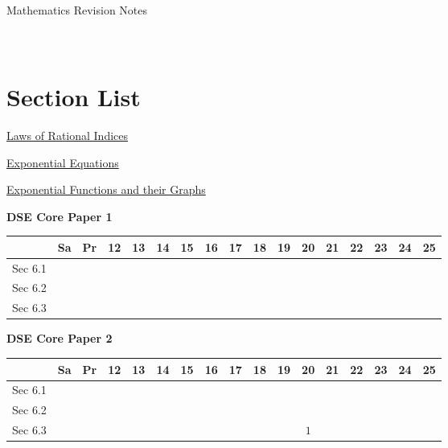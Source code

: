 \documentclass[12pt, a4paper]{article}
\begin{document}
\newpage
\newpage
\thispagestyle{empty}
\begin{center}
Mathematics Revision Notes\\\vspace{1cm}
\\\vspace{1cm}
{\fontsize{24pt}{24pt}\selectfont {Exponential Functions \NF}} \\\vspace{1cm}
\label{chapter:S4-6}

\end{center}
\vspace{0.5cm}
\hline
\section*{Section List}
\begin{enumx}[label=Sec 6.\arabic*\ ]
\item \hyperref[section:4-6-1]{Laws of Rational Indices \NF}
\item \hyperref[section:4-6-2]{Exponential Equations \NF}
\item \hyperref[section:4-6-3]{Exponential Functions and their Graphs \NF}
\end{enumx}
\begin{absolutelynopagebreak}
\begin{center}
\textbf{DSE Core Paper 1}
\end{center}
\begin{center}
\begin{tabular}{|l|c|c|c|c|c|c|c|c|c|c|c|c|c|c|c|c|}
\hline
        & Sa & Pr & 12 & 13 & 14 & 15 & 16 & 17 & 18 & 19 & 20 & 21 & 22 & 23 & 24 & 25 \\\hline\hline
Sec 6.1 &  &  &  &  &  &  &  &  &  &  &  &  &  &  &  &  \\\hline
Sec 6.2 &  &  &  &  &  &  &  &  &  &  &  &  &  &  &  &  \\\hline
Sec 6.3 &  &  &  &  &  &  &  &  &  &  &  &  &  &  &  &  \\\hline
\end{tabular}
\end{center}
\end{absolutelynopagebreak}
\begin{absolutelynopagebreak}
\begin{center}
\textbf{DSE Core Paper 2}
\end{center}
\begin{center}
\begin{tabular}{|l|c|c|c|c|c|c|c|c|c|c|c|c|c|c|c|c|}
\hline
        & Sa & Pr & 12 & 13 & 14 & 15 & 16 & 17 & 18 & 19 & 20 & 21 & 22 & 23 & 24 & 25 \\\hline\hline
Sec 6.1 &  &  &  &  &  &  &  &  &  &  &  &  &  &  &  &  \\\hline
Sec 6.2 &  &  &  &  &  &  &  &  &  &  &  &  &  &  &  &  \\\hline
Sec 6.3 &  &  &  &  &  &  &  &  &  &  &  $1$ &  &  &  &  &  \\\hline
\end{tabular}
\end{center}
\end{absolutelynopagebreak}
\end{document}
